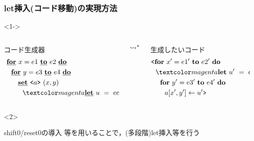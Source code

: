 \begin{frame}
  \frametitle{let挿入(コード移動)の実現方法}

  \begin{visibleenv}<1->
    \begin{columns}
      \begin{column}{0.5\textwidth}%
        コード生成器
        \begin{align*}
          & ~ \cfordo{x = e1}{e2} \\
          & ~~~ \cfordo{y = e3}{e4} \\
          & ~~~~~~\caryset{\code{a}}{(x,y)}~ ~ \\
          & ~~~~~~~~\magenta{\cLet ~u ~= ~\text{cc} ~\cIn}~~ \text{u}
        \end{align*}
      \end{column}
      $\leadsto^*$
      \begin{column}{0.5\textwidth}%
        生成したいコード
        \begin{align*}
          & \cbra \fordo{x' = e1'}{e2'} \\
          & ~~\magenta{\Let ~u' ~= ~\text{cc}' ~\In} \\
          & ~~~~\fordo{y' = e3'}{e4'} \\
          & ~~~~~~\aryset{a}{x',y'}{u'} \cket
        \end{align*}
      \end{column}
    \end{columns}
  \end{visibleenv}

  \begin{visibleenv}<2>
    \begin{exampleblock}{shift0/reset0の導入}
       等を用いることで，(多段階)let挿入等を行う
    \end{exampleblock}
  \end{visibleenv}
\end{frame}



